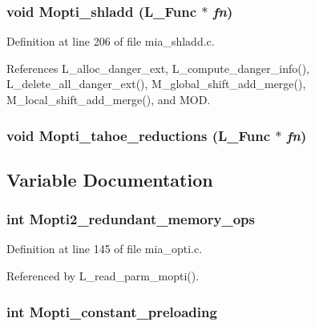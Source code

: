 \subsubsection{\setlength{\rightskip}{0pt plus 5cm}void Mopti\_\-shladd (L\_\-Func $\ast$ {\em fn})}\label{mia__opti_8h_3d5b5f62b487eb1cdb88601414214ef5}




Definition at line 206 of file mia\_\-shladd.c.

References L\_\-alloc\_\-danger\_\-ext, L\_\-compute\_\-danger\_\-info(), L\_\-delete\_\-all\_\-danger\_\-ext(), M\_\-global\_\-shift\_\-add\_\-merge(), M\_\-local\_\-shift\_\-add\_\-merge(), and MOD.
\subsubsection{\setlength{\rightskip}{0pt plus 5cm}void Mopti\_\-tahoe\_\-reductions (L\_\-Func $\ast$ {\em fn})}\label{mia__opti_8h_3595761e624a04c748a0d7d8f03578e8}




\subsection{Variable Documentation}
\subsubsection{\setlength{\rightskip}{0pt plus 5cm}int \bf{Mopti2\_\-redundant\_\-memory\_\-ops}}\label{mia__opti_8h_3080904fd0567421bcd0c45db18b2aab}




Definition at line 145 of file mia\_\-opti.c.

Referenced by L\_\-read\_\-parm\_\-mopti().
\subsubsection{\setlength{\rightskip}{0pt plus 5cm}int \bf{Mopti\_\-constant\_\-preloading}}\label{mia__opti_8h_833cedb394552394eaa0a30f872527ea}




